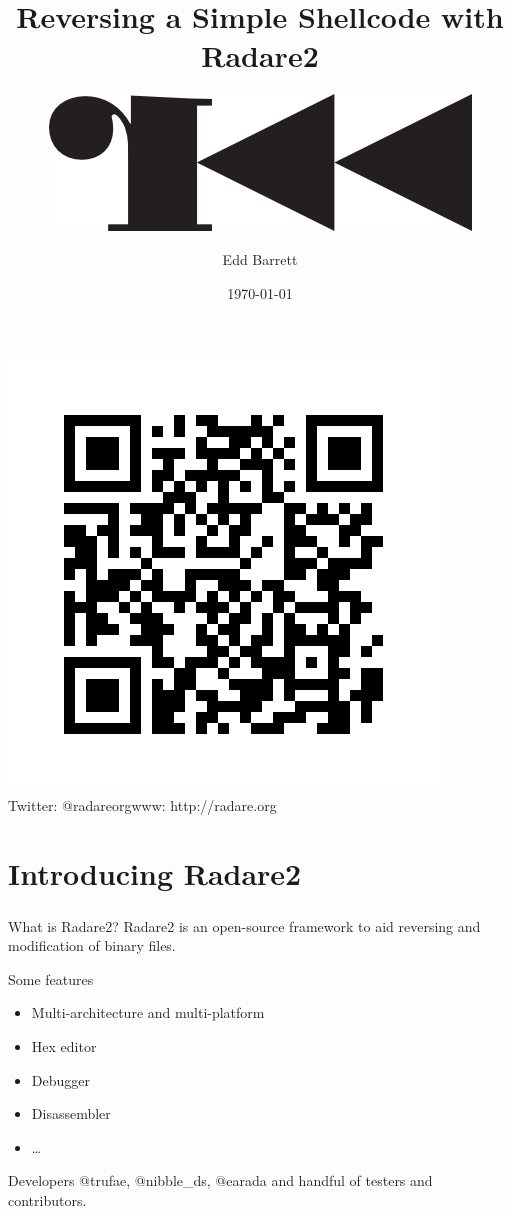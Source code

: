 \documentclass{beamer}
\title{Reversing a Simple Shellcode with Radare2}
\subtitle{\includegraphics[width=.25\textwidth]{r2.png}}
\author{Edd Barrett}
\date{\today}
\institute{@vext01}
\begin{document}
\begin{frame}
  \titlepage
  \vspace{-4em}
  \begin{center}
  \includegraphics[width=.25\textwidth]{qr.png}\\
  Twitter: @radareorg\hfill www: http://radare.org
  \end{center}
\end{frame}

\section{Introducing Radare2}

\begin{frame}[fragile]
\frametitle{\insertsection}

\begin{block}{What is Radare2?}
Radare2 is an open-source framework to aid reversing and modification of binary files.
\end{block}

\vfill

\begin{block}{Some features}
\begin{itemize}
\item Multi-architecture and multi-platform
\item Hex editor
\item Debugger
\item Disassembler
\item \ldots
\end{itemize}
\end{block}

\vfill

\begin{block}{Developers}
@trufae, @nibble\_ds, @earada and handful of testers and contributors.
\end{block}

\end{frame}
\end{document}

